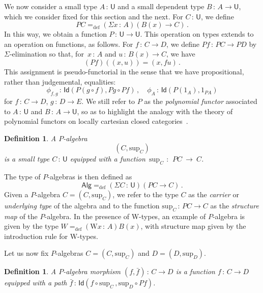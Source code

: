 \documentclass[10pt,a4paper,oneside,reqno]{amsart}
\numberwithin{equation}{section}
\theoremstyle{mythm}
\theoremstyle{mydef}
\newtheorem{definition}[theorem]{Definition}
\theoremstyle{myrmk}
\newcommand{\defeq}{=_{\mathrm{def}}}
\newcommand{\co}{\,{:}\,}
\newcommand{\Id}{\mathsf{Id}}
\newcommand{\W}{\mathrm{W}}
\newcommand{\U}{\mathsf{U}}
\newcommand{\Palg}{\mathsf{Alg}}
\renewcommand{\sup}{\mathrm{sup}}
\begin{document}
We now consider a small type $A \co \U$ and a small dependent type $B \co A \to \U$, which we consider
fixed for this section and the next. For $C \co \U$,
we define
\[
PC \defeq (\Sigma x \co A) (B(x) \to C) \, .
\]
In this way, we obtain a function $P \co \U \to \U$. This operation on types extends to an operation on functions, 
as follows. For $f \co C \to D$, we define $P f  \co PC \to PD$ by $\Sigma$-elimination
so that, for~$x \co A$ and $u \co B(x) \to C$, we have 
\[
(Pf )((x, u)) = (x, f u) \, .
\] 
This assignment is pseudo-functorial in the sense that we have propositional, rather than judgemental, equalities:
\begin{equation}
\label{equ:pseudofunP}
\phi_{f, g} \co \Id( P(g \circ f), Pg \circ Pf) \, , \quad \phi_A \co \Id( P(1_A), 1_{PA})
\end{equation}
for $f \co C \to D$, $g \co D \to E$. We still refer to $P$ as the \emph{polynomial functor} associated to $A \co \U$ 
and $B \co A \to \U$, so as to highlight the analogy with the theory of polynomial functors on locally cartesian closed categories~\cite{GambinoN:weltdp,MoerdijkI:weltc}.

\begin{definition} A \emph{$P$-algebra} 
\[
(C, \sup_C)
\] 
is a small type $C \co \U$ equipped with a function~$\sup_C~\co~PC~\to~C$. 
\end{definition}

\smallskip

 The type of $P$-algebras is then defined as 
 \[
 \Palg  \defeq (\Sigma C \co \U) (PC \to C) \, .
 \]
 Given a $P$-algebra $C = (C, \sup_C)$,
 we refer to the type $C$ as the \emph{carrier} or \emph{underlying type} of the algebra and to the function $\sup_C \co PC\to C$ as the \emph{structure map} of the $P$-algebra. 
  In the
 presence of W-types, an example of $P$-algebra is given by the type $W \defeq (\W x\co A)B(x)$, with structure map given by the introduction rule for W-types. 
 
 \medskip
 
Let us now fix $P$-algebras $C = (C, \sup_C)$ and $D = (D, \sup_D)$. 

\begin{definition} A \emph{$P$-algebra morphism} $(f, \bar{f}) \co C \to D$ 
is a function $f \co C \rightarrow D$ equipped with a path $\bar{f} \co \Id( f \circ \sup_C \, , \sup_{D} \circ P f)$.
\end{definition}
\end{document}
